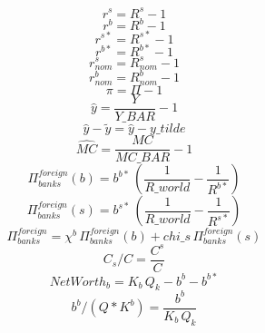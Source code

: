 \begin{dmath}
{r^s}={R^s}-1
\end{dmath}
\begin{dmath}
{r^b}={R^b}-1
\end{dmath}
\begin{dmath}
{r^{s*}}={R^{s*}}-1
\end{dmath}
\begin{dmath}
{r^{b*}}={R^{b*}}-1
\end{dmath}
\begin{dmath}
{ r^s_{nom}}={ R^s_{nom}}-1
\end{dmath}
\begin{dmath}
{ r^b_{nom}}={ R^b_{nom}}-1
\end{dmath}
\begin{dmath}
{ \pi }={ \Pi }-1
\end{dmath}
\begin{dmath}
{ \hat{y} }=\frac{{Y}}{{Y\_BAR}}-1
\end{dmath}
\begin{dmath}
{ \hat{y} - \tilde{y} }={ \hat{y} }-{y\_tilde}
\end{dmath}
\begin{dmath}
{ \hat{MC} }=\frac{{MC}}{{MC\_BAR}}-1
\end{dmath}
\begin{dmath}
{\Pi^{foreign}_{banks}(b)}={b^{b*}}\, \left(\frac{1}{{R\_world}}-\frac{1}{{R^{b*}}}\right)
\end{dmath}
\begin{dmath}
{\Pi^{foreign}_{banks}(s)}={b^{s*}}\, \left(\frac{1}{{R\_world}}-\frac{1}{{R^{s*}}}\right)
\end{dmath}
\begin{dmath}
{\Pi^{foreign}_{banks}}={\chi^b }\, {\Pi^{foreign}_{banks}(b)}+{chi\_s}\, {\Pi^{foreign}_{banks}(s)}
\end{dmath}
\begin{dmath}
{ C_s / C  }=\frac{{C^s}}{{C}}
\end{dmath}
\begin{dmath}
{ NetWorth_b }={K_b}\, { Q_k }-{b^b}-{b^{b*}}
\end{dmath}
\begin{dmath}
{ b^b / (Q * K^b) }=\frac{{b^b}}{{K_b}\, { Q_k }}
\end{dmath}
